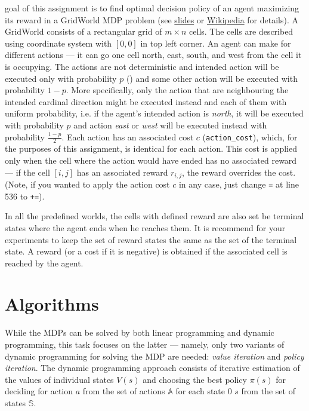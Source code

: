 \documentclass[10pt,journal,compsoc,twoside]{IEEEtran}
\begin{document}
% 
% 
% 
% 
 goal of this assignment is to find optimal decision policy of an agent maximizing its reward in a GridWorld MDP problem (see \href{http://cw.fel.cvut.cz/wiki/_media/courses/b4b36zui/mdps_show.pdf}{slides} or \href{https://en.wikipedia.org/wiki/Markov_decision_process}{Wikipedia} for details). A GridWorld consists of a rectangular grid of $m \times n$ cells. The cells are described using coordinate system with $[0,0]$ in top left corner. An agent can make for different actions --- it can go one cell north, east, south, and west from the cell it is occupying. The actions are not deterministic and intended action will be executed only with probability $p$ () and some other action will be executed with probability $1-p$. More specifically, only the action that are neighbouring the intended cardinal direction might be executed instead and each of them with uniform probability, i.e. if the agent's intended action is \textit{north}, it will be executed with probability $p$ and action \textit{east} or \textit{west} will be executed instead with probability $\frac{1-p}{2}$. Each action has an associated cost $c$ (\texttt{action\_cost}), which, for the purposes of this assignment, is identical for each action. This cost is applied only when the cell where the action would have ended has no associated reward --- if the cell $[i,j]$ has an associated reward $r_{i,j}$, the reward overrides the cost. (Note, if you wanted to apply the action cost $c$ in any case, just change \texttt{=} at line 536 to \texttt{+=}).

In all the predefined worlds, the cells with defined reward are also set be terminal states where the agent ends when he reaches them. It is recommend for your experiments to keep the set of reward states the same as the set of the terminal state. A reward (or a cost if it is negative) is obtained if the associated cell is reached by the agent.

\section{Algorithms}\label{sec:algoritgms}
While the MDPs can be solved by both linear programming and dynamic programming, this task focuses on the latter --- namely, only two variants of dynamic programming for solving the MDP are needed: \textit{value iteration} and \textit{policy iteration}. The dynamic programming approach consists of iterative estimation of the values of individual states $V(s)$ and choosing the best policy $\pi(s)$ for deciding for action $a$ from the set of actions $\mathbb{A}$ for each state 0 $s$ from the set of states $\mathbb{S}$.
\end{document}
